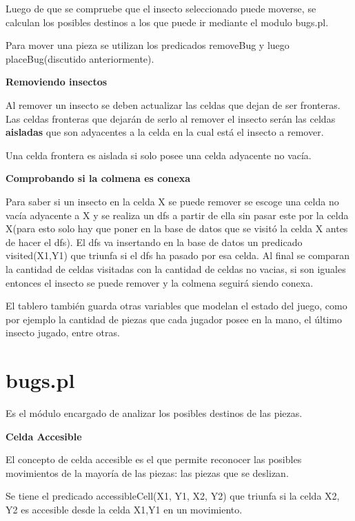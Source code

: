 \documentclass[12pt,letterpaper]{article}
\begin{document}
 	Luego de que se compruebe que el insecto seleccionado puede moverse, se calculan los posibles destinos a los que puede ir mediante el modulo bugs.pl.
 	
 	Para mover una pieza se utilizan los predicados removeBug y luego placeBug(discutido anteriormente). 
		\begin{flushleft}
		\textbf{Removiendo insectos}
	\end{flushleft} 
	Al remover un insecto se deben actualizar las celdas que dejan de ser fronteras. Las celdas fronteras que dejar\'an de serlo al remover el insecto ser\'an las celdas \textbf{aisladas} que son adyacentes a la celda en la cual est\'a el insecto a remover.
	
	Una celda frontera es aislada si solo posee una celda adyacente no vac\'ia.
	
	\begin{flushleft}
		\textbf{Comprobando si la colmena es conexa}
	\end{flushleft} 
	Para saber si un insecto en la celda X se puede remover se escoge una celda no vac\'ia adyacente a X y se realiza un dfs a partir de ella sin pasar este por la celda X(para esto solo hay que poner en la base de datos que se visit\'o la celda X antes de hacer el dfs). El dfs va insertando en la base de datos un predicado visited(X1,Y1) que triunfa si el dfs ha pasado por esa celda. Al final se comparan la cantidad de celdas visitadas con la cantidad de celdas no vacias, si son iguales entonces el insecto se puede remover y la colmena seguir\'a siendo conexa.
	
	El tablero tambi\'en guarda otras variables que modelan el estado del juego, como por ejemplo la cantidad de piezas que cada jugador posee en la mano, el \'ultimo insecto jugado, entre otras.
	
	\section*{bugs.pl}
	Es el m\'odulo encargado de analizar los posibles destinos de las piezas.
	\begin{flushleft}
		\textbf{Celda Accesible}
	\end{flushleft}
	El concepto de celda accesible es el que permite reconocer las posibles movimientos de la mayor\'ia de las piezas: las piezas que se deslizan.
	
	Se tiene el predicado accessibleCell(X1, Y1, X2, Y2) que triunfa si la celda X2, Y2 es accesible desde la celda X1,Y1 en un movimiento.
	
\end{document}
